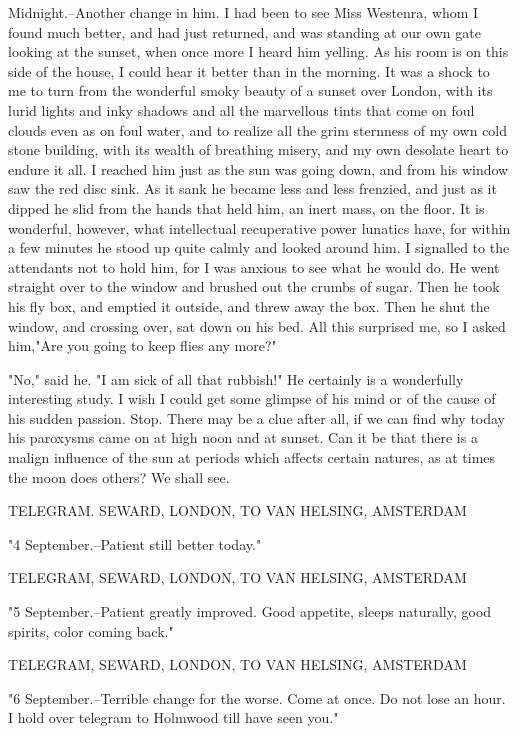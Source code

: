 Midnight.--Another change in him. I had been to see Miss Westenra, whom I found much better, and had just returned, and was standing at our own gate looking at the sunset, when once more I heard him yelling. As his room is on this side of the house, I could hear it better than in the morning. It was a shock to me to turn from the wonderful smoky beauty of a sunset over London, with its lurid lights and inky shadows and all the marvellous tints that come on foul clouds even as on foul water, and to realize all the grim sternness of my own cold stone building, with its wealth of breathing misery, and my own desolate heart to endure it all. I reached him just as the sun was going down, and from his window saw the red disc sink. As it sank he became less and less frenzied, and just as it dipped he slid from the hands that held him, an inert mass, on the floor. It is wonderful, however, what intellectual recuperative power lunatics have, for within a few minutes he stood up quite calmly and looked around him. I signalled to the attendants not to hold him, for I was anxious to see what he would do. He went straight over to the window and brushed out the crumbs of sugar. Then he took his fly box, and emptied it outside, and threw away the box. Then he shut the window, and crossing over, sat down on his bed. All this surprised me, so I asked him,"Are you going to keep flies any more?" 

"No," said he. "I am sick of all that rubbish!" He certainly is a wonderfully interesting study. I wish I could get some glimpse of his mind or of the cause of his sudden passion. Stop. There may be a clue after all, if we can find why today his paroxysms came on at high noon and at sunset. Can it be that there is a malign influence of the sun at periods which affects certain natures, as at times the moon does others? We shall see. 

TELEGRAM. SEWARD, LONDON, TO VAN HELSING, AMSTERDAM 

"4 September.--Patient still better today." 

TELEGRAM, SEWARD, LONDON, TO VAN HELSING, AMSTERDAM 

"5 September.--Patient greatly improved. Good appetite, sleeps naturally, good spirits, color coming back." 

TELEGRAM, SEWARD, LONDON, TO VAN HELSING, AMSTERDAM 

"6 September.--Terrible change for the worse. Come at once. Do not lose an hour. I hold over telegram to Holmwood till have seen you." 
